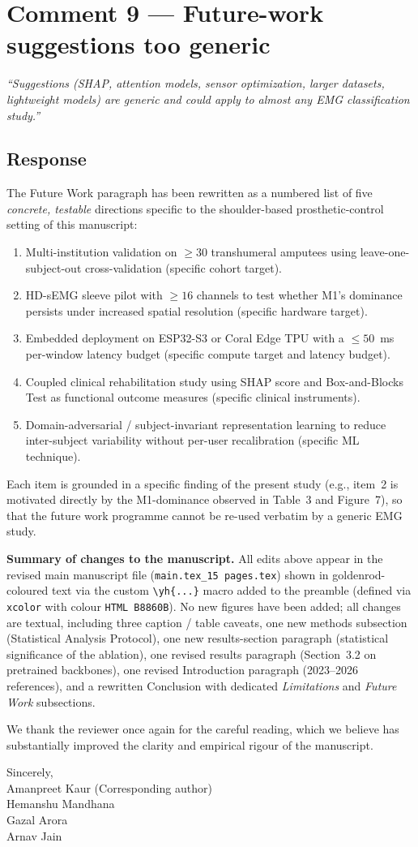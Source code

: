 \documentclass[11pt,a4paper]{article}
\begin{document}
\section*{Comment 9 — Future-work suggestions too generic}
\textit{``Suggestions (SHAP, attention models, sensor optimization, larger datasets, lightweight models) are generic and could apply to almost any EMG classification study.''}

\subsection*{Response}
The Future Work paragraph has been rewritten as a numbered list of five \emph{concrete, testable} directions specific to the shoulder-based prosthetic-control setting of this manuscript:
\begin{enumerate}
  \item Multi-institution validation on $\ge 30$ transhumeral amputees using leave-one-subject-out cross-validation (specific cohort target).
  \item HD-sEMG sleeve pilot with $\ge 16$ channels to test whether M1's dominance persists under increased spatial resolution (specific hardware target).
  \item Embedded deployment on ESP32-S3 or Coral Edge TPU with a $\le 50$~ms per-window latency budget (specific compute target and latency budget).
  \item Coupled clinical rehabilitation study using SHAP score and Box-and-Blocks Test as functional outcome measures (specific clinical instruments).
  \item Domain-adversarial / subject-invariant representation learning to reduce inter-subject variability without per-user recalibration (specific ML technique).
\end{enumerate}
Each item is grounded in a specific finding of the present study (e.g., item~2 is motivated directly by the M1-dominance observed in Table~3 and Figure~7), so that the future work programme cannot be re-used verbatim by a generic EMG study.

\bigskip
\noindent \textbf{Summary of changes to the manuscript.}
All edits above appear in the revised main manuscript file (\texttt{main.tex\_15 pages.tex}) shown in goldenrod-coloured text via the custom \texttt{\textbackslash yh\{...\}} macro added to the preamble (defined via \texttt{xcolor} with colour \texttt{HTML B8860B}). No new figures have been added; all changes are textual, including three caption / table caveats, one new methods subsection (Statistical Analysis Protocol), one new results-section paragraph (statistical significance of the ablation), one revised results paragraph (Section~3.2 on pretrained backbones), one revised Introduction paragraph (2023--2026 references), and a rewritten Conclusion with dedicated \emph{Limitations} and \emph{Future Work} subsections.

\noindent We thank the reviewer once again for the careful reading, which we believe has substantially improved the clarity and empirical rigour of the manuscript.

\vspace{2em}
\noindent Sincerely,\\[0.5em]
Amanpreet Kaur (Corresponding author) \\
Hemanshu Mandhana \\
Gazal Arora \\
Arnav Jain
\end{document}
